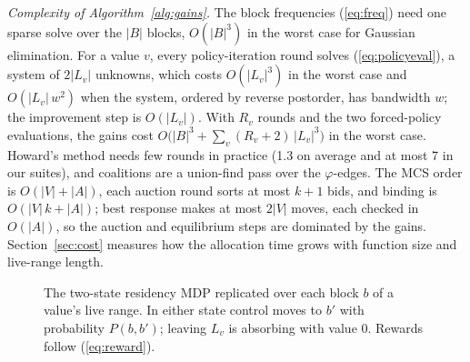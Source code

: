 \documentclass{ieeeaccess}
\newcommand{\Reg}{\mathsf{R}}
\newcommand{\Mem}{\mathsf{M}}
\newcommand{\cld}{c_{\mathrm{ld}}}
\newcommand{\cst}{c_{\mathrm{st}}}
\begin{document}
\textit{Complexity of Algorithm~\ref{alg:gains}.} The block frequencies
(\ref{eq:freq}) need one sparse solve over the $|B|$ blocks, $O(|B|^3)$
in the worst case for Gaussian elimination. For a value $v$, every
policy-iteration round solves (\ref{eq:policyeval}), a system of
$2|L_v|$ unknowns, which costs $O(|L_v|^3)$ in the worst case and
$O(|L_v|\,w^2)$ when the system, ordered by reverse postorder, has
bandwidth $w$; the improvement step is $O(|L_v|)$. With $R_v$ rounds
and the two forced-policy evaluations, the gains cost
$O\big(|B|^3+\sum_{v}(R_v+2)\,|L_v|^3\big)$ in the worst case. Howard's
method needs few rounds in practice (1.3 on average and at most 7 in
our suites), and coalitions are a union-find pass over the
$\varphi$-edges. The MCS order is $O(|V|+|A|)$, each auction round sorts
at most $k+1$ bids, and binding is $O(|V|\,k+|A|)$; best response
makes at most $2|V|$ moves, each checked in $O(|A|)$, so the auction
and equilibrium steps are dominated by the gains.
Section~\ref{sec:cost} measures how the allocation time grows with
function size and live-range length.

\begin{figure}[t]
\centering
{}
\caption{The two-state residency MDP replicated over each block $b$ of a
value's live range. In either state control moves to $b'$ with
probability $P(b,b')$; leaving $L_v$ is absorbing with value 0.
Rewards follow (\ref{eq:reward}).}
\label{fig:mdp}
\end{figure}
\end{document}
